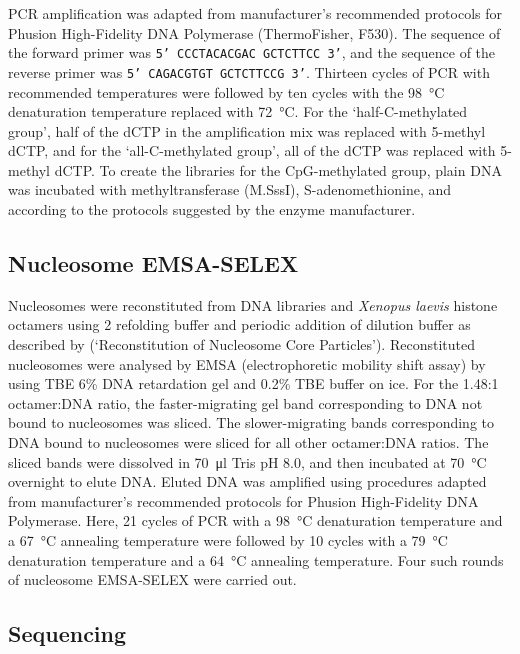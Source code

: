 \documentclass[a4paper, numbers=noenddot]{scrbook}
\begin{document}
PCR amplification was adapted from manufacturer's recommended protocols for Phusion High-Fidelity DNA Polymerase (ThermoFisher, F530).  The sequence of the forward primer was \texttt{5' CCCTACACGAC GCTCTTCC 3'}, and the sequence of the reverse primer was \texttt{5' CAGACGTGT GCTCTTCCG 3'}.  Thirteen cycles of PCR with recommended temperatures were followed by ten cycles with the \SI{98}{\celsius} denaturation temperature replaced with \SI{72}{\celsius}.  For the `half-C-methylated group', half of the dCTP in the amplification mix was replaced with 5-methyl dCTP, and for the `all-C-methylated group', all of the dCTP was replaced with 5-methyl dCTP.  To create the libraries for the CpG-methylated group, plain DNA was incubated with methyltransferase (M.SssI), S-adenomethionine, and  according to the protocols suggested by the enzyme manufacturer.

\subsection{Nucleosome EMSA-SELEX}
\label{ssec:emsaselex_methods_selex}

Nucleosomes were reconstituted from DNA libraries and \emph{Xenopus laevis} histone octamers using \SI{2}{\Molar}  refolding buffer and periodic addition of dilution buffer as described by \citet{dyer_reconstitution_2003} (`Reconstitution of Nucleosome Core Particles').  Reconstituted nucleosomes were analysed by EMSA (electrophoretic mobility shift assay) by using TBE 6\% DNA retardation gel and 0.2\% TBE buffer on ice.  For the 1.48:1 octamer:DNA ratio, the faster-migrating gel band corresponding to DNA not bound to nucleosomes was sliced.  The slower-migrating bands corresponding to DNA bound to nucleosomes were sliced for all other octamer:DNA ratios.  The sliced bands were dissolved in \SI{70}{\micro\litre} Tris pH 8.0, and then incubated at \SI{70}{\celsius} overnight to elute DNA.  Eluted DNA was amplified using procedures adapted from manufacturer's recommended protocols for Phusion High-Fidelity DNA Polymerase.  Here, 21 cycles of PCR with a \SI{98}{\celsius} denaturation temperature and a \SI{67}{\celsius} annealing temperature were followed by 10 cycles with a \SI{79}{\celsius} denaturation temperature and a \SI{64}{\celsius} annealing temperature.  Four such rounds of nucleosome EMSA-SELEX were carried out.

\subsection{Sequencing}
\label{ssec:emsaselex_methods_seq}
\end{document}
